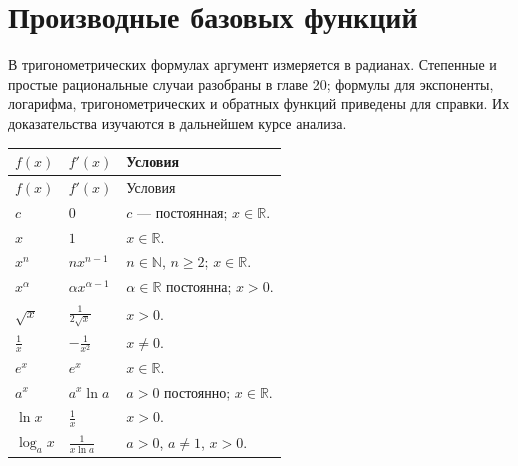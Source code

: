 \section*{Производные базовых функций}

В тригонометрических формулах аргумент измеряется в радианах. Степенные и простые рациональные случаи разобраны в главе 20; формулы для экспоненты, логарифма, тригонометрических и обратных функций приведены для справки. Их доказательства изучаются в дальнейшем курсе анализа.

\begingroup\small\renewcommand{\arraystretch}{1.6}\begin{longtable}{|p{.25\linewidth}|p{.29\linewidth}|p{.36\linewidth}|}\hline\(f(x)\)&\(f'(x)\)&Условия\\[3pt]\hline\endfirsthead\hline\(f(x)\)&\(f'(x)\)&Условия\\[3pt]\hline\endhead

\(\displaystyle c\)&\(\displaystyle 0\)&\(c\) — постоянная; \(x\in\mathbb R\).\\[3pt]\hline

\(\displaystyle x\)&\(\displaystyle 1\)&\(x\in\mathbb R\).\\[3pt]\hline
\(\displaystyle x^n\)&\(\displaystyle nx^{n-1}\)&\(n\in\mathbb N\), \(n\ge2\); \(x\in\mathbb R\).\\[3pt]\hline

\(\displaystyle x^\alpha\)&\(\displaystyle \alpha x^{\alpha-1}\)&\(\alpha\in\mathbb R\) постоянна; \(x>0\).\\[3pt]\hline

\(\displaystyle \sqrt x\)&\(\displaystyle \frac1{2\sqrt x}\)&\(x>0\).\\[3pt]\hline

\(\displaystyle \frac1x\)&\(\displaystyle -\frac1{x^2}\)&\(x\ne0\).\\[3pt]\hline

\(\displaystyle e^x\)&\(\displaystyle e^x\)&\(x\in\mathbb R\).\\[3pt]\hline

\(\displaystyle a^x\)&\(\displaystyle a^x\ln a\)&\(a>0\) постоянно; \(x\in\mathbb R\).\\[3pt]\hline

\(\displaystyle \ln x\)&\(\displaystyle \frac1x\)&\(x>0\).\\[3pt]\hline

\(\displaystyle \log_a x\)&\(\displaystyle \frac1{x\ln a}\)&\(a>0\), \(a\ne1\), \(x>0\).\\[3pt]\hline


\end{longtable}

